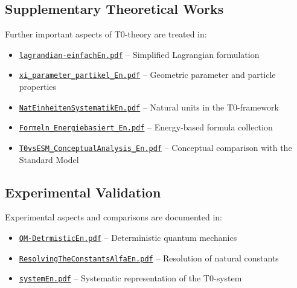 \documentclass[12pt,a4paper]{article}
\numberwithin{equation}{section}
\begin{document}
	\subsection{Supplementary Theoretical Works}
	
	Further important aspects of T0-theory are treated in:
	
	\begin{itemize}
		\item \href{https://github.com/jpascher/T0-Time-Mass-Duality/blob/main/2/pdf/lagrandian-einfachEn.pdf}{\texttt{lagrandian-einfachEn.pdf}} -- Simplified Lagrangian formulation
		\item \href{https://github.com/jpascher/T0-Time-Mass-Duality/blob/main/2/pdf/xi_parmater_partikel_En.pdf}{\texttt{xi\_parameter\_partikel\_En.pdf}} -- Geometric parameter and particle properties
		\item \href{https://github.com/jpascher/T0-Time-Mass-Duality/blob/main/2/pdf/NatEinheitenSystematikEn.pdf}{\texttt{NatEinheitenSystematikEn.pdf}} -- Natural units in the T0-framework
		\item \href{https://github.com/jpascher/T0-Time-Mass-Duality/blob/main/2/pdf/Formeln_Energiebasiert_En.pdf}{\texttt{Formeln\_Energiebasiert\_En.pdf}} -- Energy-based formula collection
		\item \href{https://github.com/jpascher/T0-Time-Mass-Duality/blob/main/2/pdf/T0vsESM_ConceptualAnalysis_En.pdf}{\texttt{T0vsESM\_ConceptualAnalysis\_En.pdf}} -- Conceptual comparison with the Standard Model
	\end{itemize}
	
	\subsection{Experimental Validation}
	
	Experimental aspects and comparisons are documented in:
	
	\begin{itemize}
		\item \href{https://github.com/jpascher/T0-Time-Mass-Duality/blob/main/2/pdf/QM-DetrmisticEn.pdf}{\texttt{QM-DetrmisticEn.pdf}} -- Deterministic quantum mechanics
		\item \href{https://github.com/jpascher/T0-Time-Mass-Duality/blob/main/2/pdf/ResolvingTheConstantsAlfaEn.pdf}{\texttt{ResolvingTheConstantsAlfaEn.pdf}} -- Resolution of natural constants
		\item \href{https://github.com/jpascher/T0-Time-Mass-Duality/blob/main/2/pdf/systemEn.pdf}{\texttt{systemEn.pdf}} -- Systematic representation of the T0-system
	\end{itemize}
	
\end{document}

